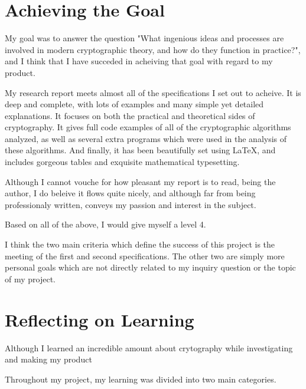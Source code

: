 \documentclass[12pt, a4paper, draft]{report}
\begin{document}
\section{Achieving the Goal}

My goal was to answer the question "What ingenious ideas and processes
are involved in modern cryptographic theory, and how do they function
in practice?", and I think that I have succeded in acheiving that goal
with regard to my product.


My research report meets almost all of the specifications I set out to
acheive. It is deep and complete, with lots of examples and many
simple yet detailed explanations. It focuses on both the practical
and theoretical sides of cryptography. It gives full code examples
of all of the cryptographic algorithms analyzed, as well as several
extra programs which were used in the analysis of these algorithms.
And finally, it has been beautifully set using \LaTeX, and includes
gorgeous tables and exquisite mathematical typesetting.

Although I cannot vouche for how pleasant my report is to read, being
the author, I do beleive it flows quite nicely, and although far from
being professionaly written, conveys my passion and interest in the
subject.

Based on all of the above, I would give myself a level 4.


I think the two main criteria which define the success of this project
is the meeting of the first and second specifications. The other two
are simply more personal goals which are not directly related to my
inquiry question or the topic of my project.

\section{Reflecting on Learning}

Although I learned an incredible amount about crytography while
investigating and making my product

Throughout my project, my learning was divided into two main
categories.
\end{document}
